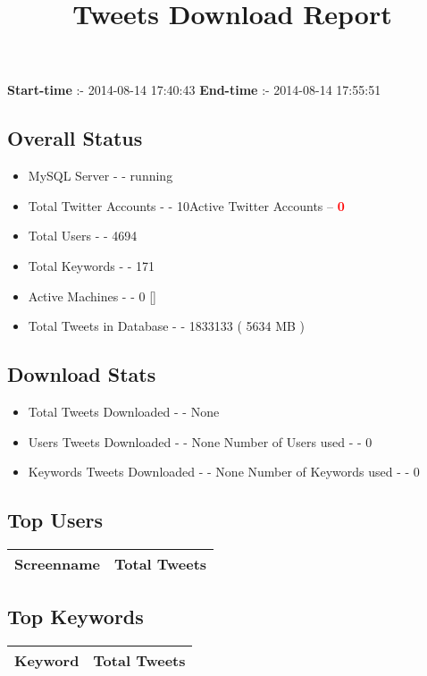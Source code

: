 \documentclass{article}\usepackage[T1]{fontenc}
\begin{document}
\title{\textbf{Tweets Download Report}}
               \date{}
                \maketitle
               \centerline{\textbf{Start-time} :- 2014-08-14 17:40:43 \hspace{40pt} \textbf{End-time} :- 2014-08-14 17:55:51}               \subsection*{Overall Status}                \begin{itemize}                \item MySQL Server - - running               \item Total Twitter Accounts - - 10\newline Active Twitter Accounts -- \textcolor{red}{\textbf{0}}               \item Total Users - - 4694               \item Total Keywords - - 171               \item Active Machines - - 0 []               \item Total Tweets in Database - - 1833133 ( 5634 MB )               \end{itemize}               \subsection*{Download Stats}                \begin{itemize}                \item Total Tweets Downloaded - - None               \item Users Tweets Downloaded - - None \newline Number of Users used - - 0               \item Keywords Tweets Downloaded - - None \newline Number of Keywords used - - 0              \end{itemize}              \subsection*{Top Users}\begin{tabular}{|c|c|}         \hline         Screenname & Total Tweets \\ 
 \hline
\end{tabular}\subsection*{Top Keywords}\begin{tabular}{|c|c|}         \hline         Keyword & Total Tweets \\ 
 \hline
\end{tabular}
\end{document}
